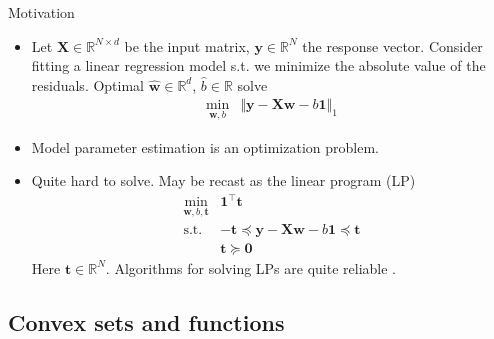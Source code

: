 \documentclass{beamer}
\numberwithin{equation}{section}
\begin{document}
\begin{frame}{Motivation}
    \begin{itemize}
        \item
        Let $ \mathbf{X} \in \mathbb{R}^{N \times d} $ be the input matrix,
        $ \mathbf{y} \in \mathbb{R}^N $ the response vector. Consider
        fitting a linear regression model s.t. we minimize the
        absolute value of the residuals. Optimal $ \hat{\mathbf{w}} \in
        \mathbb{R}^d $, $ \hat{b} \in \mathbb{R} $ solve
        \begin{equation*}
            \begin{array}{ll}
                \displaystyle\min_{\mathbf{w}, b} &
                    \Vert\mathbf{y} - \mathbf{Xw} - b\mathbf{1}\Vert_1
            \end{array}
        \end{equation*}

        \item
        Model parameter estimation is an optimization problem.

        \item
        Quite hard to solve. May be recast as the linear program (LP)
        \cite{bv_convex_opt}
        \begin{equation*}
            \begin{array}{ll}
                \displaystyle\min_{\mathbf{w}, b, \mathbf{t}} &
                    \mathbf{1}^\top\mathbf{t} \\
                \text{s.t.} &
                    -\mathbf{t} \preceq \mathbf{y} - \mathbf{Xw} - b\mathbf{1}
                    \preceq \mathbf{t} \\
                & \mathbf{t} \succeq \mathbf{0}
            \end{array}
        \end{equation*}
        Here $ \mathbf{t} \in \mathbb{R}^N $. Algorithms for solving LPs
        are quite reliable \cite{bv_convex_opt}.
    \end{itemize}
\end{frame}

\subsection{Convex sets and functions}
\end{document}
